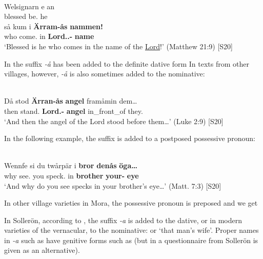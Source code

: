 \ea\label{}
\\
\gll Welsignarn  e  an\\
blessed  be.{\prs}  he\\
\gll så  kum  i  \textbf{Ärram-ås} \textbf{nammen!}\\
who  come.{\prs}  in  \textbf{Lord.{}.{\dat}-{\poss}} \textbf{name}\\
\glt ‘Blessed is he who comes in the name of the \href{http://www.godrules.net/library/topics/topic1192.htm}{Lord}!’ (Matthew 21:9) [S20]
\z

In  the suffix\textit{ {}-å} has been added to the definite dative form In texts from other villages, however,\textit{ {}-å} is also sometimes added to the nominative:

\ea\label{}
\\
\gll Då  stod  \textbf{Ärran-ås} \textbf{angel} framåmin  dem…\\
then  stand.{\pst}  \textbf{Lord.{}-{\poss}} \textbf{angel} in\_front\_of  they.{\obl}\\
\glt ‘And then the angel of the Lord stood before them…’ (Luke 2:9) [S20]
\z

In the following example, the suffix is added to a postposed possessive pronoun:

\ea\label{}
\\
\gll Wennfe  si  du  twårpär  i  \textbf{bror} \textbf{denås} \textbf{öga…}\\
why  see.{\prs}  you  speck.{\pl}  in  \textbf{brother} \textbf{your-{\poss}} \textbf{eye}\\
\glt ‘And why do you see specks in your brother’s eye…’ (Matt. 7:3) [S20]
\z

In other village varieties in Mora, the possessive pronoun is preposed and we get 

In Sollerön, according to \citet[357]{AnderssonEtAl1999}, the suffix\textit{ {}-a} is added to the dative, or in modern varieties of the vernacular, to the nominative:  or  ‘that man’s wife’. Proper names in\textit{ {}-a} such as  have genitive forms such as (but in a questionnaire from Sollerön  is given as an alternative).

